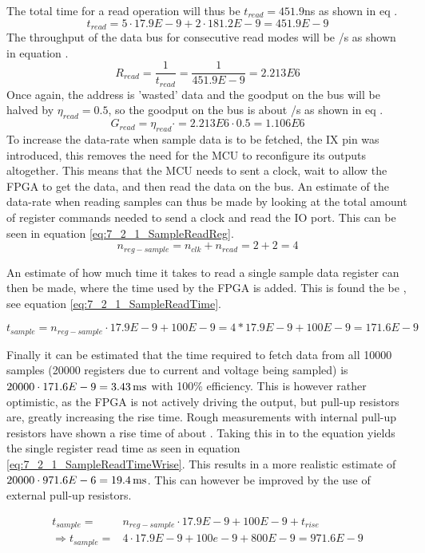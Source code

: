 The total time for a read operation will thus be $t_{read} = 451.9$ns as shown in eq .
\begin{equation}\label{eq:7_2_1_Read_Register2}
    t_{read} = 5\cdot 17.9E-9 + 2\cdot 181.2E-9 = 451.9E-9 
\end{equation}
The throughput of the data bus for consecutive read modes will be /s as shown in equation .
\begin{equation}\label{eq:7_2_1_Read_Throughput}
    R_{read} = \frac{1}{t_{read}} =\frac{1}{451.9E-9} = 2.213E6  
\end{equation}
Once again, the address is 'wasted' data and the goodput on the bus will be halved by $\eta_{read} = 0.5$, so the goodput on the bus is about /s as shown in eq .
\begin{equation}\label{eq:7_2_1_Read_Goodput}
    G_{read} = \eta_{read} \cdot  = 2.213E6\cdot 0.5  = 1.106E6 
\end{equation}
To increase the data-rate when sample data is to be fetched, the IX pin was introduced, this removes the need for the MCU to reconfigure its outputs altogether. This means that the MCU needs to sent a clock, wait  to allow the FPGA to get the data, and then read the data on the bus. An estimate of the data-rate when reading samples can thus be made by looking at the total amount of register commands needed to send a clock and read the IO port. This can be seen in equation \ref{eq:7_2_1_SampleReadReg}.
\begin{equation}\label{eq:7_2_1_SampleReadReg}
    n_{reg-sample} = n_{clk}+n_{read} = 2+2 = 4
\end{equation}

An estimate of how much time it takes to read a single sample data register can then be made, where the  time used by the FPGA is added. This is found the be , see equation \ref{eq:7_2_1_SampleReadTime}.

\begin{equation}\label{eq:7_2_1_SampleReadTime}
    t_{sample} = n_{reg-sample}\cdot17.9E-9 + 100E-9 = 4*17.9E-9+100E-9 = 171.6E-9
\end{equation}

Finally it can be estimated that the time required to fetch data from all 10000 samples (20000 registers due to current and voltage being sampled) is $20000\cdot171.6E-9 = \SI{3.43}{\milli\second}$ with 100\% efficiency. This is however rather optimistic, as the FPGA is not actively driving the output, but pull-up resistors are, greatly increasing the rise time. Rough measurements with internal pull-up resistors have shown a rise time of about . Taking this in to the equation yields the single register read time as seen in equation \ref{eq:7_2_1_SampleReadTimeWrise}. This results in a more realistic estimate of $20000\cdot 971.6E-6 = \SI{19.4}{\milli\second}$. This can however be improved by the use of external pull-up resistors.

\begin{equation}\label{eq:7_2_1_SampleReadTimeWrise}
    \begin{split}
        t_{sample} = &n_{reg-sample}\cdot17.9E-9 + 100E-9+t_{rise} \\
        \Rightarrow t_{sample} = &4\cdot17.9E-9+100e-9+800E-9 = 971.6E-9
    \end{split}
\end{equation}

